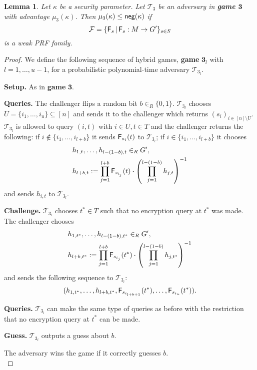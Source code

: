 \documentclass[10pt]{extarticle}
\newtheorem{Lem}[Thm]{Lemma}
\begin{document}
\begin{Lem}\label{gamethreeprf} Let $\kappa$ be a security parameter. Let $\mathcal{T}_3$ be an adversary in \textbf{\upshape game $\boldsymbol 3$} with advantage $\mu_{3}(\kappa)$. Then $\mu_{3}(\kappa)\leq\text{\upshape\sffamily neg}(\kappa)$ if 
\[\mathcal{F}=\{\text{\upshape\sffamily F}_s\,|\,\text{\upshape\sffamily F}_s:M\to G^\prime\}_{s\in S}\] 
is a weak PRF family.
\end{Lem}
\begin{proof} We define the following sequence of hybrid games, \textbf{game} $\boldsymbol 3_l$ with $l=1,\ldots,u-1$, for a probabilistic polynomial-time adversary $\mathcal{T}_{3_l}$.
\noindent\begin{description}
 \item\textbf{Setup.} As in \textbf{game} $\boldsymbol 3$.
\item\textbf{Queries.} The challenger flips a random bit $b\in_R\{0,1\}$. $\mathcal{T}_{3_l}$ chooses $U=\{i_1,\ldots,i_u\}\subseteq[n]$ and sends it to the challenger which returns $(s_i)_{i\in[n]\setminus U}$. $\mathcal{T}_{3_l}$ is allowed to query $(i,t)$ with $i\in U, t\in T$ and the challenger returns the following: if $i\notin \{i_1,\ldots,i_{l+b}\}$ it sends $\text{\upshape\sffamily F}_{s_i}(t)$ to $\mathcal{T}_{3_l}$; if $i\in \{i_1,\ldots,i_{l+b}\}$ it chooses 
\begin{align*} & h_{1,t},\ldots,h_{l-(1-b),t}\in_R G^\prime,\\
  & h_{l+b,t}:= \prod_{j=1}^{l+b} \text{\upshape\sffamily F}_{s_{i_j}}(t)\cdot\left(\prod_{j=1}^{l-(1-b)}h_{j,t}\right)^{-1}
\end{align*}
and sends $h_{i,t}$ to $\mathcal{T}_{3_l}$.
\item\textbf{Challenge.} $\mathcal{T}_{3_l}$ chooses $t^*\in T$ such that no encryption query at $t^*$ was made. The challenger chooses 
\begin{align*} & h_{1,t^*},\ldots,h_{l-(1-b),t^*}\in_R G^\prime,\\
 & h_{l+b,t^*}:= \prod_{j=1}^{l+b} \text{\upshape\sffamily F}_{s_{i_j}}(t^*)\cdot\left(\prod_{j=1}^{l-(1-b)}h_{j,t^*}\right)^{-1}
\end{align*}
and sends the following sequence to $\mathcal{T}_{3_l}$: 
\[(h_{1,t^*},\ldots,h_{l+b,t^*},\text{\upshape\sffamily F}_{s_{i_{l+b+1}}}(t^*),\ldots,\text{\upshape\sffamily F}_{s_{i_u}}(t^*)).\]
\item\textbf{Queries.} $\mathcal{T}_{3_l}$ can make the same type of queries as before with the restriction that no encryption query at $t^*$ can be made.
\item\textbf{Guess.} $\mathcal{T}_{3_l}$ outputs a guess about $b$.
\end{description}
The adversary wins the game if it correctly guesses $b$.\\


\end{proof}
\end{document}
